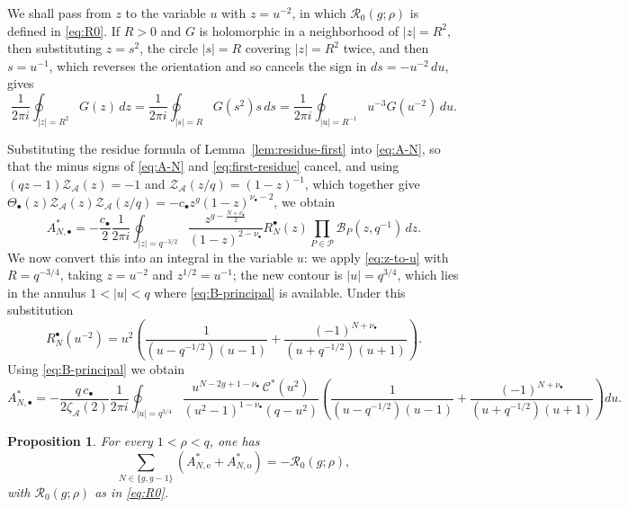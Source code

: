 \documentclass[a4paper,reqno]{amsart}
\numberwithin{equation}{section}
\newtheorem{proposition}[theorem]{Proposition}
\theoremstyle{remark}
\theoremstyle{definition}
\newcommand{\A}{\mathcal{A}}
\newcommand{\zA}{\zeta_{\A}}
\begin{document}
We shall pass from $z$ to the variable $u$ with $z=u^{-2}$, in which
$\mathcal R_0(g;\rho)$ is defined in \eqref{eq:R0}. If $R>0$ and $G$ is
holomorphic in a neighborhood of $|z|=R^2$, then substituting $z=s^2$, the
circle $|s|=R$ covering $|z|=R^2$ twice, and then $s=u^{-1}$, which reverses
the orientation and so cancels the sign in $ds=-u^{-2}\,du$, gives
\begin{equation}\label{eq:z-to-u}
\frac{1}{2\pi i}\oint_{|z|=R^2}G(z)\,dz
=
\frac{1}{2\pi i}\oint_{|s|=R}G(s^2)s\,ds
=
\frac{1}{2\pi i}\oint_{|u|=R^{-1}}u^{-3}G(u^{-2})\,du.
\end{equation}

Substituting the residue formula of Lemma~\ref{lem:residue-first} into
\eqref{eq:A-N}, so that the minus signs of \eqref{eq:A-N} and
\eqref{eq:first-residue} cancel, and using $(qz-1)\mathcal Z_{\A}(z)=-1$ and
$\mathcal Z_{\A}(z/q)=(1-z)^{-1}$, which together give
$\Theta_\bullet(z)\mathcal Z_{\A}(z)\mathcal Z_{\A}(z/q)
=-c_\bullet z^{g}(1-z)^{\nu_\bullet-2}$, we obtain
$$
A_{N,\bullet}^{*}
=
-\frac{c_\bullet}{2}
\frac{1}{2\pi i}
\oint_{|z|=q^{-3/2}}
\frac{z^{g-\frac{N+\nu_\bullet}{2}}}{(1-z)^{2-\nu_\bullet}}
R_N^{\bullet}(z)
\prod_{P\in\mathcal P}\mathcal B_P(z,q^{-1})\,dz.
$$
We now convert this into an integral in the variable $u$: we apply
\eqref{eq:z-to-u} with $R=q^{-3/4}$, taking $z=u^{-2}$ and
$z^{1/2}=u^{-1}$; the new contour is $|u|=q^{3/4}$, which lies in the
annulus $1<|u|<q$ where \eqref{eq:B-principal} is available. Under this
substitution
$$
R_N^{\bullet}(u^{-2})
=
u^{2}
\left(
\frac{1}{(u-q^{-1/2})(u-1)}
+
\frac{(-1)^{N+\nu_\bullet}}{(u+q^{-1/2})(u+1)}
\right).
$$
Using \eqref{eq:B-principal} we obtain
\begin{equation}\label{eq:A-N-u}
A_{N,\bullet}^{*}
=
-\frac{q\,c_\bullet}{2\zA(2)}
\frac{1}{2\pi i}
\oint_{|u|=q^{3/4}}
\frac{u^{N-2g+1-\nu_\bullet}\,\mathcal C^*(u^2)}
{(u^2-1)^{1-\nu_\bullet}(q-u^2)}
\left(
\frac{1}{(u-q^{-1/2})(u-1)}
+
\frac{(-1)^{N+\nu_\bullet}}
{(u+q^{-1/2})(u+1)}
\right)du.
\end{equation}

\begin{proposition}
\label{prop:A-total}
For every $1<\rho<q$, one has
\begin{equation}\label{eq:A-total}
\sum_{N\in\{g,g-1\}}
\left(
A_{N,\mathrm e}^{*}
+
A_{N,\mathrm o}^{*}
\right)
=
-\mathcal R_0(g;\rho),
\end{equation}
with $\mathcal R_0(g;\rho)$ as in \eqref{eq:R0}.
\end{proposition}
\end{document}
